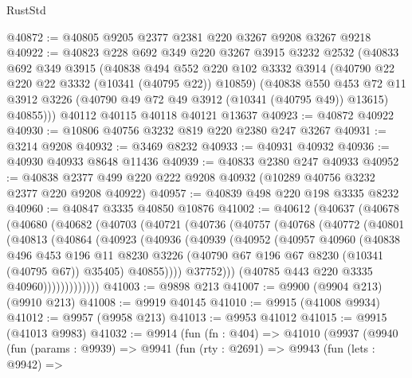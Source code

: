 \begin{lexlean}{RustStd}
\begin{coremodule}
@40872 := @40805 @9205 @2377 @2381 @220 @3267 @9208 @3267 @9218
@40922 := @40823
    @228
    @692
    @349
    @220
    @3267
    @3915
    @3232
    @2532
    (@40833
      @692
      @349
      @3915
      (@40838
        @494
        @552
        @220
        @102
        @3332
        @3914
        (@40790 @22 @220 @22 @3332 (@10341 (@40795 @22)) @10859)
        (@40838
          @550
          @453
          @72
          @11
          @3912
          @3226
          (@40790 @49 @72 @49 @3912 (@10341 (@40795 @49)) @13615)
          @40855)))
    @40112
    @40115
    @40118
    @40121
    @13637
@40923 := @40872 @40922
@40930 := @10806 @40756 @3232 @819 @220 @2380 @247 @3267
@40931 := @3214 @9208
@40932 := @3469 @8232
@40933 := @40931 @40932
@40936 := @40930 @40933 @8648 @11436
@40939 := @40833 @2380 @247 @40933
@40952 := @40838 @2377 @499 @220 @222 @9208 @40932 (@10289 @40756 @3232 @2377 @220 @9208 @40922)
@40957 := @40839 @498 @220 @198 @3335 @8232
@40960 := @40847 @3335 @40850 @10876
@41002 := @40612
    (@40637
      (@40678
        (@40680
          (@40682
            (@40703
              (@40721
                (@40736
                  (@40757
                    (@40768
                      (@40772
                        (@40801
                          (@40813
                            (@40864
                              (@40923
                                (@40936
                                  (@40939
                                    (@40952
                                      (@40957
                                        @40960
                                        (@40838
                                          @496
                                          @453
                                          @196
                                          @11
                                          @8230
                                          @3226
                                          (@40790 @67 @196 @67 @8230 (@10341 (@40795 @67)) @35405)
                                          @40855))))
                                  @37752)))
                            (@40785 @443 @220 @3335 @40960)))))))))))))
@41003 := @9898 @213
@41007 := @9900 (@9904 @213) (@9910 @213)
@41008 := @9919 @40145
@41010 := @9915 (@41008 @9934)
@41012 := @9957 (@9958 @213)
@41013 := @9953 @41012
@41015 := @9915 (@41013 @9983)
@41032 := @9914
    (fun (fn : @404) =>
    @41010
      (@9937
        (@9940
          (fun (params : @9939) =>
          @9941
            (fun (rty : @2691) =>
            @9943
              (fun (lets : @9942) =>

\end{coremodule}
\end{lexlean}

